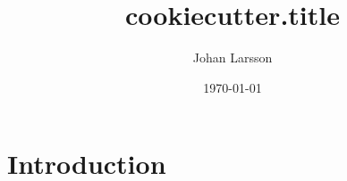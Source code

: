 \documentclass[english,a4paper]{article}
\title{{cookiecutter.title}}
\author{Johan Larsson}
\affil{The Department of Statistics, Lund University}
\date{\today}
\begin{document}
\maketitle


\hypertarget{introduction}{%
\section{Introduction}\label{introduction}}

\end{document}
